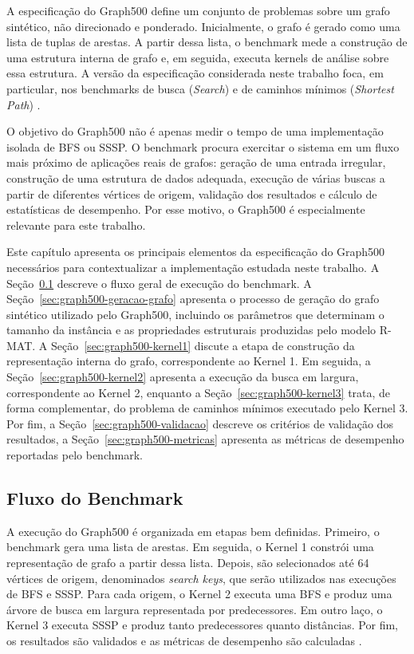 A especificação do Graph500 define um conjunto de problemas sobre um grafo sintético, 
não direcionado e ponderado. Inicialmente, o grafo é gerado como uma lista de tuplas de arestas. 
A partir dessa lista, o benchmark mede a construção de uma estrutura interna de grafo e, 
em seguida, executa kernels de análise sobre essa estrutura. 
A versão da especificação considerada neste trabalho foca, em particular, 
nos benchmarks de busca (\textit{Search}) e de caminhos mínimos (\textit{Shortest Path}) \cite{graph500spec}.

O objetivo do Graph500 não é apenas medir o tempo de uma implementação isolada 
de BFS ou SSSP. O benchmark procura exercitar o sistema em um fluxo mais próximo
 de aplicações reais de grafos: geração de uma entrada irregular, construção de uma estrutura de dados adequada, 
 execução de várias buscas a partir de diferentes vértices de origem, validação dos resultados
  e cálculo de estatísticas de desempenho. Por esse motivo, o Graph500 é especialmente relevante para este trabalho.

Este capítulo apresenta os principais elementos da especificação do Graph500 necessários para contextualizar 
a implementação estudada neste trabalho. A Seção~\ref{sec:graph500-fluxo} descreve o fluxo geral de execução do benchmark. 
A Seção~\ref{sec:graph500-geracao-grafo} apresenta o processo de geração do grafo sintético utilizado pelo Graph500, incluindo os parâmetros que determinam o tamanho da instância e as propriedades estruturais produzidas pelo modelo R-MAT. 
A Seção~\ref{sec:graph500-kernel1} discute a etapa de construção da representação interna do grafo, correspondente ao Kernel 1. 
Em seguida, a Seção~\ref{sec:graph500-kernel2} apresenta a execução da busca em largura, correspondente ao Kernel 2, 
enquanto a Seção~\ref{sec:graph500-kernel3} trata, de forma complementar, do problema de caminhos mínimos executado pelo Kernel 3. 
Por fim, a Seção~\ref{sec:graph500-validacao} descreve os critérios de validação dos resultados, 
a Seção~\ref{sec:graph500-metricas} apresenta as métricas de desempenho reportadas pelo benchmark.


\subsection{Fluxo do Benchmark}
\label{sec:graph500-fluxo}

A execução do Graph500 é organizada em etapas bem definidas. 
Primeiro, o benchmark gera uma lista de arestas. 
Em seguida, o Kernel 1 constrói uma representação de grafo a partir dessa lista. 
Depois, são selecionados até 64 vértices de origem, denominados \textit{search keys}, 
que serão utilizados nas execuções de BFS e SSSP. 
Para cada origem, o Kernel 2 executa uma BFS e 
produz uma árvore de busca em largura representada por predecessores. 
Em outro laço, o Kernel 3 executa SSSP e produz tanto predecessores quanto distâncias. 
Por fim, os resultados são validados e as métricas de desempenho são calculadas \cite{graph500spec}.

